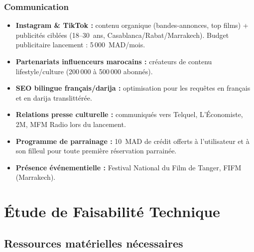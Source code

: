 \documentclass[12pt,a4paper,openany]{report}
\begin{document}
\subsubsection{Communication}

\begin{itemize}
  \item \textbf{Instagram \& TikTok :} contenu organique (bandes-annonces, top films) + publicités ciblées (18–30~ans, Casablanca/Rabat/Marrakech). Budget publicitaire lancement : 5\,000~MAD/mois.
  \item \textbf{Partenariats influenceurs marocains :} créateurs de contenu lifestyle/culture (200\,000 à 500\,000 abonnés).
  \item \textbf{SEO bilingue français/darija :} optimisation pour les requêtes en français et en darija translittérée.
  \item \textbf{Relations presse culturelle :} communiqués vers Telquel, L'Économiste, 2M, MFM Radio lors du lancement.
  \item \textbf{Programme de parrainage :} 10~MAD de crédit offerts à l'utilisateur et à son filleul pour toute première réservation parrainée.
  \item \textbf{Présence événementielle :} Festival National du Film de Tanger, FIFM (Marrakech).
\end{itemize}

\section{Étude de Faisabilité Technique}

\subsection{Ressources matérielles nécessaires}
\end{document}
